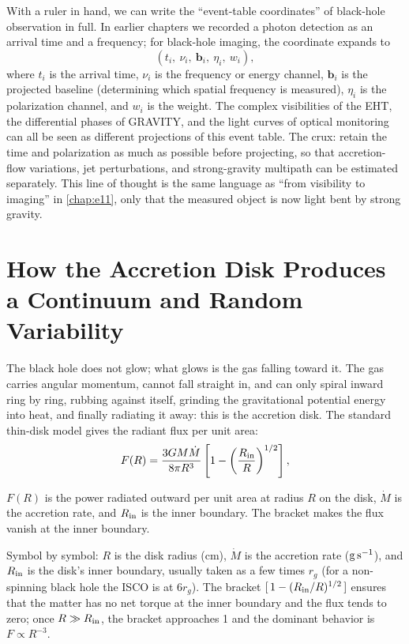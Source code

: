 With a ruler in hand, we can write the ``event-table coordinates'' of black-hole observation in full. In earlier chapters we recorded a photon detection as an arrival time and a frequency; for black-hole imaging, the coordinate expands to
\[
  (t_i,\ \nu_i,\ \bm{b}_i,\ \eta_i,\ w_i),
\]
where \(t_i\) is the arrival time, \(\nu_i\) is the frequency or energy channel, \(\bm{b}_i\) is the projected baseline (determining which spatial frequency is measured), \(\eta_i\) is the polarization channel, and \(w_i\) is the weight. The complex visibilities of the EHT, the differential phases of GRAVITY, and the light curves of optical monitoring can all be seen as different projections of this event table. The crux: retain the time and polarization as much as possible before projecting, so that accretion-flow variations, jet perturbations, and strong-gravity multipath can be estimated separately. This line of thought is the same language as ``from visibility to imaging'' in \ref{chap:e11}, only that the measured object is now light bent by strong gravity.

\section{How the Accretion Disk Produces a Continuum and Random Variability}
\label{sec:e19-disk}

The black hole does not glow; what glows is the gas falling toward it. The gas carries angular momentum, cannot fall straight in, and can only spiral inward ring by ring, rubbing against itself, grinding the gravitational potential energy into heat, and finally radiating it away: this is the accretion disk. The standard thin-disk model gives the radiant flux per unit area:
\begin{equation}
  F(R)=\frac{3GM\dot M}{8\pi R^3}
  \left[1-\left(\frac{R_{\rm in}}{R}\right)^{1/2}\right],
  \label{eq:e19-flux}
\end{equation}
\begin{formulaexplain}
\(F(R)\) is the power radiated outward per unit area at radius \(R\) on the disk, \(\dot M\) is the accretion rate, and \(R_{\rm in}\) is the inner boundary. The bracket makes the flux vanish at the inner boundary.
\end{formulaexplain}
Symbol by symbol: \(R\) is the disk radius (cm), \(\dot M\) is the accretion rate (\({\rm g\,s^{-1}}\)), and \(R_{\rm in}\) is the disk's inner boundary, usually taken as a few times \(r_g\) (for a non-spinning black hole the ISCO is at \(6r_g\)). The bracket \([\,1-(R_{\rm in}/R)^{1/2}\,]\) ensures that the matter has no net torque at the inner boundary and the flux tends to zero; once \(R\gg R_{\rm in}\), the bracket approaches 1 and the dominant behavior is \(F\propto R^{-3}\).

